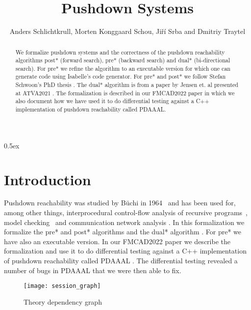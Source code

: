 \documentclass[10pt,a4paper]{article}
\begin{document}
\title{Pushdown Systems}
\author{Anders Schlichtkrull, Morten Konggaard Schou, Ji\v{r}\'i Srba and Dmitriy Traytel}
\date{}

\maketitle

\begin{abstract}
\noindent
We formalize pushdown systems and the correctness of the pushdown reachability algorithms post* (forward search), pre* (backward search) and dual* (bi-directional search).
For pre* we refine the algorithm to an executable version for which one can generate code using Isabelle's code generator.
For pre* and post* we follow Stefan Schwoon's PhD thesis \cite{schwoon2002model}. The dual* algorithm is from a paper by Jensen et. al presented at ATVA2021 \cite{DBLP:conf/atva/JensenSSSVD21}.
The formalization is described in our FMCAD2022 paper \cite{DBLP:conf/fmcad/SchlichtkrullSST22} in which we also document how we have used it to do differential
testing against a C++ implementation of pushdown reachability called PDAAAL.


\end{abstract}

\tableofcontents

\newpage

\parindent 0pt
\parskip 0.5ex

\section{Introduction}
Pushdown reachability was studied by B{\"u}chi in 1964~\cite{buchi1964regular} and has been used for, among other things, 
interprocedural control-flow analysis of recursive programs~\cite{esparza1999automata,conway2005incremental}, 
model checking~\cite{esparza2001bdd,moped,jmoped,bouajjani1997reachability} and communication network analysis \cite{JKMSST:coNEXT:18,jensen2020aalwines,DJJKMSST:TON:21}.
In this formalization we formalize the pre* and post* algorithms \cite{schwoon2002model} and the dual* algorithm \cite{DBLP:conf/atva/JensenSSSVD21}. For pre* we have also an executable version.
In our FMCAD2022 paper \cite{DBLP:conf/fmcad/SchlichtkrullSST22} we describe the formalization and use it to
do differential testing against a C++ implementation of pushdown reachability called PDAAAL \cite{DBLP:conf/atva/JensenSSSVD21}.
The differential testing revealed a number of bugs in PDAAAL that we were then able to fix.

\begin{figure}
\begin{center}
  \texttt{[image: session\_graph]}
\end{center}
\caption{Theory dependency graph}
\label{fig:thys}
\end{figure}

\newpage





\end{document}
